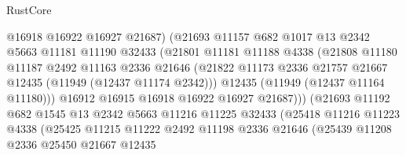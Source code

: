 \begin{lexlean}{RustCore}
\begin{coremodule}
                              @16918
                              @16922
                              @16927
                              @21687)
                            (@21693
                              @11157
                              @682
                              @1017
                              @13
                              @2342
                              @5663
                              @11181
                              @11190
                              @32433
                              (@21801
                                @11181
                                @11188
                                @4338
                                (@21808
                                  @11180
                                  @11187
                                  @2492
                                  @11163
                                  @2336
                                  @21646
                                  (@21822
                                    @11173
                                    @2336
                                    @21757
                                    @21667
                                    @12435
                                    (@11949 (@12437 @11174 @2342)))
                                  @12435
                                  (@11949 (@12437 @11164 @11180)))
                                @16912
                                @16915
                                @16918
                                @16922
                                @16927
                                @21687)))
                          (@21693
                            @11192
                            @682
                            @1545
                            @13
                            @2342
                            @5663
                            @11216
                            @11225
                            @32433
                            (@25418
                              @11216
                              @11223
                              @4338
                              (@25425
                                @11215
                                @11222
                                @2492
                                @11198
                                @2336
                                @21646
                                (@25439
                                  @11208
                                  @2336
                                  @25450
                                  @21667
                                  @12435

\end{coremodule}
\end{lexlean}
